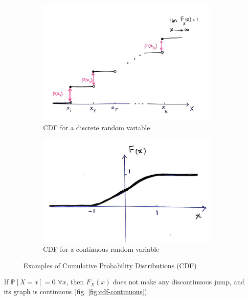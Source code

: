 \documentclass[../template.tex]{subfiles}
\begin{document}
\begin{figure}[htp]
    \begin{subfigure}[t]{0.45\textwidth}
      \centering
      \includegraphics[width=\textwidth]{image001.png}
      \caption{CDF for a discrete random variable\label{fig:cdf-discrete}}
      \label{fig:f1}
    \end{subfigure}
    \hfill
    \begin{subfigure}[t]{0.45\textwidth}
      \centering
      \includegraphics[width=\textwidth]{image002.png}
      \caption{CDF for a continuous random variable\label{fig:cdf-continuous}}
      \label{fig:f2}
    \end{subfigure}
    \caption{Examples of Cumulative Probability Distributions (CDF)\label{fig:cdfs}}
  \end{figure}

If $\mathbb{P}[X=x] = 0$ $\forall x$, then $F_X(x)$ does not make any discontinuous jump, and its graph is continuous (fig. \ref{fig:cdf-continuous}).
\end{document}
